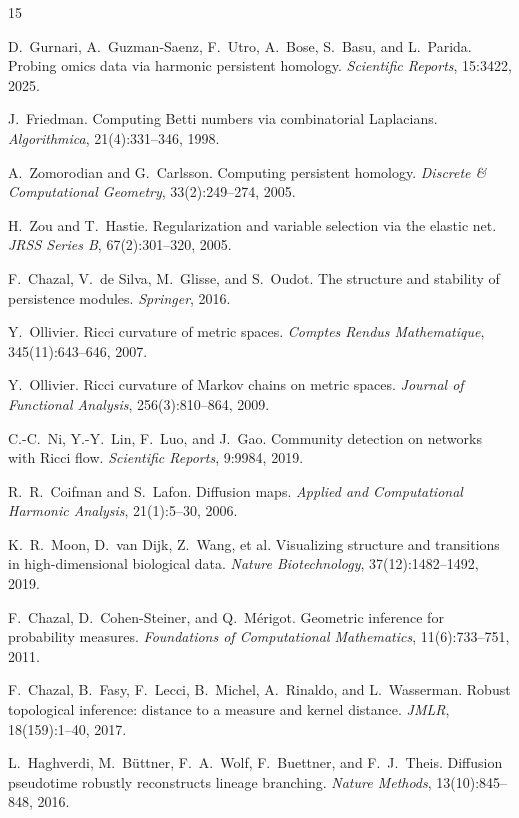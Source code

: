 \documentclass[11pt]{article}
\begin{document}

\begin{thebibliography}{15}

D.~Gurnari, A.~Guzman-Saenz, F.~Utro, A.~Bose, S.~Basu, and L.~Parida.
Probing omics data via harmonic persistent homology.
\emph{Scientific Reports}, 15:3422, 2025.

J.~Friedman.
Computing Betti numbers via combinatorial Laplacians.
\emph{Algorithmica}, 21(4):331--346, 1998.

A.~Zomorodian and G.~Carlsson.
Computing persistent homology.
\emph{Discrete \& Computational Geometry}, 33(2):249--274, 2005.

H.~Zou and T.~Hastie.
Regularization and variable selection via the elastic net.
\emph{JRSS Series B}, 67(2):301--320, 2005.

F.~Chazal, V.~de Silva, M.~Glisse, and S.~Oudot.
The structure and stability of persistence modules.
\emph{Springer}, 2016.

Y.~Ollivier.
Ricci curvature of metric spaces.
\emph{Comptes Rendus Mathematique}, 345(11):643--646, 2007.

Y.~Ollivier.
Ricci curvature of Markov chains on metric spaces.
\emph{Journal of Functional Analysis}, 256(3):810--864, 2009.

C.-C.~Ni, Y.-Y.~Lin, F.~Luo, and J.~Gao.
Community detection on networks with Ricci flow.
\emph{Scientific Reports}, 9:9984, 2019.

R.~R.~Coifman and S.~Lafon.
Diffusion maps.
\emph{Applied and Computational Harmonic Analysis}, 21(1):5--30, 2006.

K.~R.~Moon, D.~van Dijk, Z.~Wang, et al.
Visualizing structure and transitions in high-dimensional biological data.
\emph{Nature Biotechnology}, 37(12):1482--1492, 2019.

F.~Chazal, D.~Cohen-Steiner, and Q.~M\'erigot.
Geometric inference for probability measures.
\emph{Foundations of Computational Mathematics}, 11(6):733--751, 2011.

F.~Chazal, B.~Fasy, F.~Lecci, B.~Michel, A.~Rinaldo, and L.~Wasserman.
Robust topological inference: distance to a measure and kernel distance.
\emph{JMLR}, 18(159):1--40, 2017.

L.~Haghverdi, M.~B\"uttner, F.~A.~Wolf, F.~Buettner, and F.~J.~Theis.
Diffusion pseudotime robustly reconstructs lineage branching.
\emph{Nature Methods}, 13(10):845--848, 2016.

\end{thebibliography}
\end{document}
